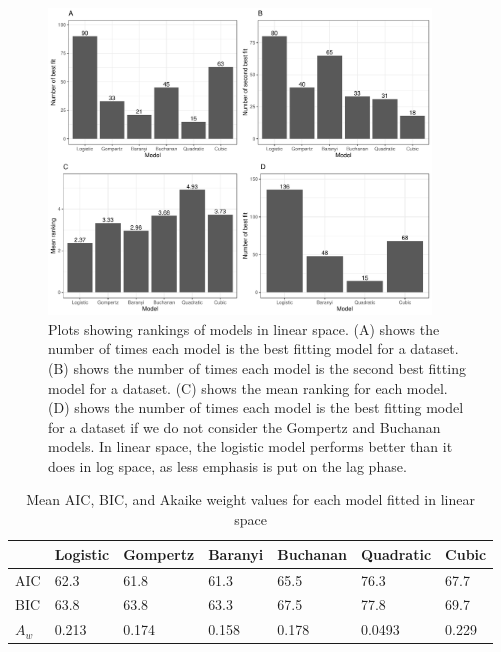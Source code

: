 \documentclass[11pt, a4paper]{article}
\begin{document}
        
                \begin{figure}[H]
        \includegraphics[width=4in]{../results/best_fit_frequency_bar_linear.pdf}
        \centering
        \caption{Plots showing rankings of models in linear space. (A) shows the number of times each model is the best fitting model for a dataset. (B) shows the number of times each model is the second best fitting model for a dataset. (C) shows the mean ranking for each model. (D) shows the number of times each model is the best fitting model for a dataset if we do not consider the Gompertz and Buchanan models.  In linear space, the logistic model performs better than it does in log space, as less emphasis is put on the lag phase.}
        \label{sup:frequency_bar_linear}
        \end{figure} 
        
                        \begin{table}[H]
\centering
\begin{tabular}{l|llllll}
       & Logistic & Gompertz & Baranyi & Buchanan & Quadratic & Cubic \\ \hline
AIC & 62.3    & 61.8    & 61.3   & 65.5    & 76.3     & 67.7 \\
BIC & 63.8    & 63.8    & 63.3   & 67.5    & 77.8     & 69.7 \\
$A_w$ & 0.213     & 0.174    & 0.158   & 0.178     & 0.0493     &   0.229

\end{tabular}
\caption{Mean AIC, BIC, and Akaike weight values for each model fitted in linear space}
\label{suptable:meanAICBIClinear}
\end{table}
\end{document}
